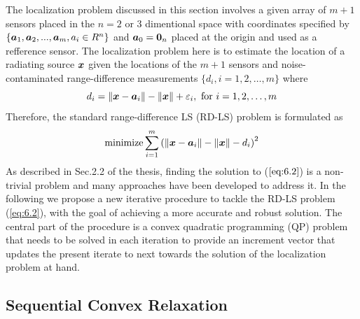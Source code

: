 The localization problem discussed in this section involves a given array of $m+1$ sensors placed in the $n = 2$ or 3 dimentional space with coordinates specified by $\{\mbox{\boldmath$a$}_1, \mbox{\boldmath$a$}_2, . . . , \mbox{\boldmath$a$}_m , a_i \in R^n\}$ and  $\mbox{\boldmath$a$}_0 = \mbox{\boldmath${0}$}_n$ placed at the origin and used as a refference sensor. The localization problem here is to estimate the location of a radiating source $\mbox{\boldmath$x$}$ given the locations of the $m+1$ sensors and noise-contaminated range-difference measurements $\{d_i, i = 1, 2, \ldots, m\}$ where 
\setcounter{abc}{0}
\begin{equation} \label{eq:6.1}
d_i = \|\mbox{\boldmath$x$} - \mbox{\boldmath$a$}_i\| - \|\mbox{\boldmath$x$}\| + \varepsilon_i, \mbox{ for } i = 1, 2, \ldots, m
\end{equation}
Therefore, the standard range-difference LS (RD-LS) problem is formulated as
\begin{equation} \label{eq:6.2}
\mathop{\mbox{minimize}} \sum^m_{i=1}\left( \|\mbox{\boldmath$x$} - \mbox{\boldmath$a$}_i\| - \|\mbox{\boldmath$x$}\| - d_i\right)^2
\end{equation}
As described in Sec.2.2 of the thesis, finding the solution to ($\ref{eq:6.2}$) is a non-trivial problem and many approaches have been developed to address it. In the following we propose a new iterative procedure to tackle the RD-LS problem (\ref{eq:6.2}), with the goal of achieving a more accurate and robust solution. The central part of the procedure is a convex quadratic programming (QP) problem that needs to be solved in each iteration to provide an increment vector that updates the present iterate to next towards the solution of the localization problem at hand.

\subsection{Sequential Convex Relaxation}

%
%
%

